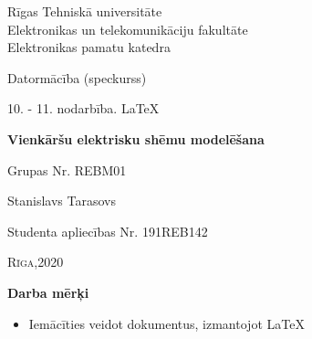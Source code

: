 \documentclass{article}
\begin{document}
\begin{titlepage}
\begin{center}
\large{Rīgas Tehniskā universitāte \\\vspace{3mm} Elektronikas un telekomunikāciju fakultāte \\\vspace{3mm} Elektronikas pamatu katedra}
\end{center}

\vspace{3cm}

\begin{center}
Datormācība (speckurss)
\end{center}

\begin{center}
10. - 11. nodarbība. LaTeX
\end{center}

\begin{center}
\textbf{Vienkāršu elektrisku shēmu modelēšana}
\end{center}

\vspace{5cm}

\begin{flushright}
Grupas Nr. REBM01
 \end{flushright}

 \begin{flushright}
Stanislavs Tarasovs
 \end{flushright}
 
 \begin{flushright}
Studenta apliecības Nr. 191REB142
 \end{flushright}

\vfill
\begin{center}
\scshape{Rīga,2020}
\end{center}
\end{titlepage}

\vspace{0.25cm}
    
\textbf{Darba mērķi}
\begin{itemize}
    \item Iemācīties veidot dokumentus, izmantojot LaTeX
\end{itemize}
\end{document}
